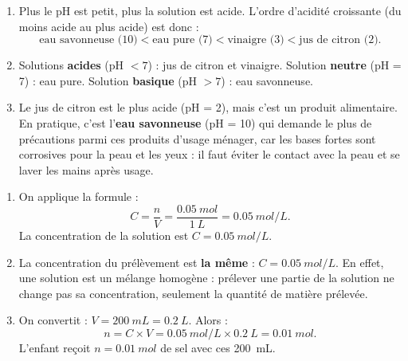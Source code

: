 \documentclass[11pt]{article}
\newcommand{\cle}[1]{{\popxbold\color{popdark}#1}}
\begin{document}
\begin{corrige}
\begin{enumerate}
\item Plus le pH est petit, plus la solution est acide. L'ordre d'acidité croissante (du moins acide au plus acide) est donc :
\[ \text{eau savonneuse (10)} < \text{eau pure (7)} < \text{vinaigre (3)} < \text{jus de citron (2)}. \]
\item Solutions \textbf{acides} (pH $< 7$) : jus de citron et vinaigre. Solution \textbf{neutre} (pH = 7) : eau pure. Solution \textbf{basique} (pH $> 7$) : eau savonneuse.
\item Le jus de citron est le plus acide (pH = 2), mais c'est un produit alimentaire. En pratique, c'est l'\textbf{eau savonneuse} (pH = 10) qui demande le plus de précautions parmi ces produits d'usage ménager, car les bases fortes sont corrosives pour la peau et les yeux : il faut éviter le contact avec la peau et se laver les mains après usage.
\end{enumerate}
\end{corrige}

\begin{corrige}
\begin{enumerate}
\item On applique la formule :
\[ C = \frac{n}{V} = \frac{\SI{0,05}{mol}}{\SI{1}{L}} = \SI{0,05}{mol/L}. \]
La concentration de la solution est $\boxed{C = \SI{0,05}{mol/L}}$.
\item La concentration du prélèvement est \textbf{la même} : $C = \SI{0,05}{mol/L}$. En effet, une solution est un mélange \cle{homogène} : prélever une partie de la solution ne change pas sa concentration, seulement la quantité de matière prélevée.
\item On convertit : $V = \SI{200}{mL} = \SI{0,2}{L}$. Alors :
\[ n = C \times V = \SI{0,05}{mol/L} \times \SI{0,2}{L} = \SI{0,01}{mol}. \]
L'enfant reçoit $\boxed{n = \SI{0,01}{mol}}$ de sel avec ces \SI{200}{mL}.
\end{enumerate}
\end{corrige}
\end{document}
